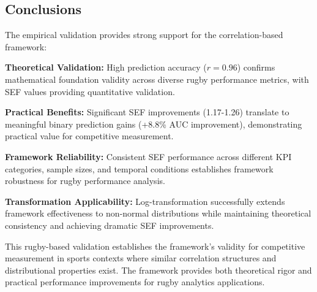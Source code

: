 \subsection{Conclusions}

The empirical validation provides strong support for the correlation-based framework:

\textbf{Theoretical Validation:} High prediction accuracy ($r = 0.96$) confirms mathematical foundation validity across diverse rugby performance metrics, with SEF values providing quantitative validation.

\textbf{Practical Benefits:} Significant SEF improvements (1.17-1.26) translate to meaningful binary prediction gains (+8.8\% AUC improvement), demonstrating practical value for competitive measurement.

\textbf{Framework Reliability:} Consistent SEF performance across different KPI categories, sample sizes, and temporal conditions establishes framework robustness for rugby performance analysis.

\textbf{Transformation Applicability:} Log-transformation successfully extends framework effectiveness to non-normal distributions while maintaining theoretical consistency and achieving dramatic SEF improvements.

This rugby-based validation establishes the framework's validity for competitive measurement in sports contexts where similar correlation structures and distributional properties exist. The framework provides both theoretical rigor and practical performance improvements for rugby analytics applications.

